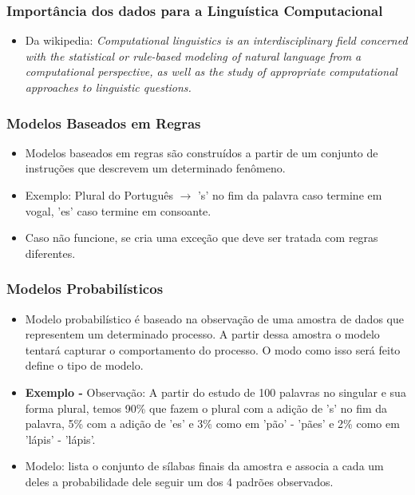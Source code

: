 \documentclass[11pt]{beamer}
\begin{document}
\begin{frame}
\frametitle{Importância dos dados para a Linguística Computacional}
\begin{itemize}
	\item Da wikipedia: \textit{Computational linguistics is an interdisciplinary field concerned with the statistical or rule-based modeling of natural language from a computational perspective, as well as the study of appropriate computational approaches to linguistic questions.}\\
\end{itemize}
\end{frame}

\begin{frame}
\frametitle{Modelos Baseados em Regras}
\begin{itemize}
	\item Modelos baseados em regras são construídos a partir de um conjunto de instruções que descrevem um determinado fenômeno.\\
	\item Exemplo: Plural do Português $\rightarrow$ 's' no fim da palavra caso termine em vogal, 'es' caso termine em consoante.\\
	\item Caso não funcione, se cria uma exceção que deve ser tratada com regras diferentes.\\
\end{itemize}
\end{frame}

\begin{frame}
\frametitle{Modelos Probabilísticos}
\begin{itemize}
	\item Modelo probabilístico é baseado na observação de uma amostra de dados que representem um determinado processo. A partir dessa amostra o modelo tentará capturar o comportamento do processo. O modo como isso será feito define o tipo de modelo.\\
	\item \textbf{Exemplo - }Observação: A partir do estudo de 100 palavras no singular e sua forma plural, temos 90\% que fazem o plural com a adição de 's' no fim da palavra, 5\% com a adição de 'es' e 3\% como em 'pão' - 'pães' e 2\% como em 'lápis' - 'lápis'.\\
	\item Modelo: lista o conjunto de sílabas finais da amostra e associa a cada um deles a probabilidade dele seguir um dos 4 padrões observados.\\
\end{itemize}
\end{frame}
\end{document}
